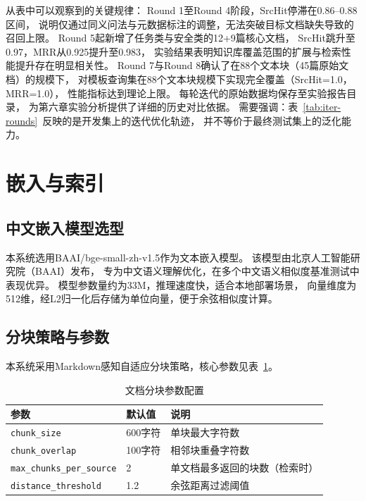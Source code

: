 从表中可以观察到的关键规律：
Round 1至Round 4阶段，SrcHit停滞在0.86--0.88区间，
说明仅通过同义问法与元数据标注的调整，无法突破目标文档缺失导致的召回上限。
Round 5起新增了任务类与安全类的12+9篇核心文档，
SrcHit跳升至0.97，MRR从0.925提升至0.983，
实验结果表明知识库覆盖范围的扩展与检索性能提升存在明显相关性。
Round 7与Round 8确认了在88个文本块（45篇原始文档）的规模下，
对模板查询集在88个文本块规模下实现完全覆盖（SrcHit=1.0， MRR=1.0），
性能指标达到理论上限。
每轮迭代的原始数据均保存至实验报告目录，
为第六章实验分析提供了详细的历史对比依据。
需要强调：表~\ref{tab:iter-rounds}~反映的是开发集上的迭代优化轨迹，
并不等价于最终测试集上的泛化能力。

\section{嵌入与索引}

\subsection{中文嵌入模型选型}

本系统选用BAAI/bge-small-zh-v1.5作为文本嵌入模型。
该模型由北京人工智能研究院（BAAI）发布，
专为中文语义理解优化，在多个中文语义相似度基准测试中表现优异。
模型参数量约为33M，推理速度快，适合本地部署场景，
向量维度为512维，经L2归一化后存储为单位向量，便于余弦相似度计算。

\subsection{分块策略与参数}

本系统采用Markdown感知自适应分块策略，核心参数见表~\ref{tab:chunk-params}。

\begin{table}[htbp]
\centering
\caption{文档分块参数配置}
\label{tab:chunk-params}
\begin{tabular}{lll}
\toprule
参数 & 默认值 & 说明 \\
\midrule
\texttt{chunk\_size} & 600字符 & 单块最大字符数 \\
\texttt{chunk\_overlap} & 100字符 & 相邻块重叠字符数 \\
\texttt{max\_chunks\_per\_source} & 2 & 单文档最多返回的块数（检索时） \\
\texttt{distance\_threshold} & 1.2 & 余弦距离过滤阈值 \\
\bottomrule
\end{tabular}
\end{table}

